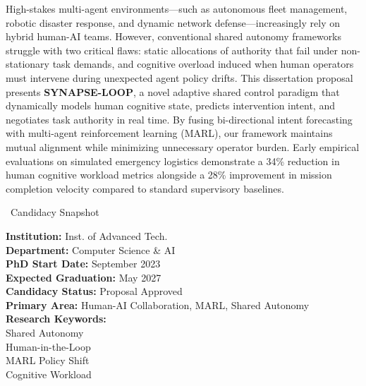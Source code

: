 \documentclass[11pt,a4paper]{scrartcl}
\begin{document}
\noindent
\begin{minipage}[t]{0.64\textwidth}
    \begin{abstractbox}
        High-stakes multi-agent environments---such as autonomous fleet management, robotic disaster response, and dynamic network defense---increasingly rely on hybrid human-AI teams. However, conventional shared autonomy frameworks struggle with two critical flaws: static allocations of authority that fail under non-stationary task demands, and cognitive overload induced when human operators must intervene during unexpected agent policy drifts. This dissertation proposal presents \textbf{SYNAPSE-LOOP}, a novel adaptive shared control paradigm that dynamically models human cognitive state, predicts intervention intent, and negotiates task authority in real time. By fusing bi-directional intent forecasting with multi-agent reinforcement learning (MARL), our framework maintains mutual alignment while minimizing unnecessary operator burden. Early empirical evaluations on simulated emergency logistics demonstrate a 34\% reduction in human cognitive workload metrics alongside a 28\% improvement in mission completion velocity compared to standard supervisory baselines.
    \end{abstractbox}
\end{minipage}%
\hfill
\begin{minipage}[t]{0.33\textwidth}
    \begin{infobox}{\faBookmark\ Candidacy Snapshot}
        \sffamily\small\raggedright
        \textbf{\color{NavyPrimary}Institution:} Inst. of Advanced Tech.\\
        \textbf{\color{NavyPrimary}Department:} Computer Science \& AI\\
        \textbf{\color{NavyPrimary}PhD Start Date:} September 2023\\
        \textbf{\color{NavyPrimary}Expected Graduation:} May 2027\\
        \textbf{\color{NavyPrimary}Candidacy Status:} Proposal Approved\\
        \textbf{\color{NavyPrimary}Primary Area:} Human-AI Collaboration, MARL, Shared Autonomy\\[4pt]
        \textbf{\color{NavyPrimary}Research Keywords:}\\
        {\color{TealAccent}\textbf{\textbullet}} Shared Autonomy\\
        {\color{TealAccent}\textbf{\textbullet}} Human-in-the-Loop\\
        {\color{TealAccent}\textbf{\textbullet}} MARL Policy Shift\\
        {\color{TealAccent}\textbf{\textbullet}} Cognitive Workload
    \end{infobox}
\end{minipage}
\end{document}
